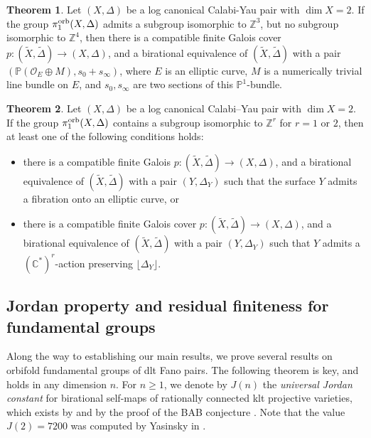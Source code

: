 \documentclass{amsart}
\newcommand{\pp}{\mathbb{P}}
\newcommand{\zz}{\mathbb{Z}}
\theoremstyle{definition}
\newtheorem{alphtheorem}{Theorem}
\theoremstyle{remark}
\numberwithin{equation}{section}
\begin{document}
\begin{alphtheorem}\label{introthm:fun-group-Z3}
Let $(X,\Delta)$ be a log canonical Calabi-Yau pair with $\dim X = 2$. If the group $\pi_1^{\rm orb}(X,\Delta)$ admits a subgroup isomorphic to $\mathbb{Z}^3$, but no subgroup isomorphic to $\mathbb{Z}^4$, then there is a compatible finite Galois cover $p:(\tilde{X},\tilde{\Delta})\to (X,\Delta)$, and a birational equivalence of $(\tilde{X},\tilde{\Delta})$ with a pair $(\mathbb{P}(\mathcal{O}_E\oplus M),s_0+s_{\infty})$, where $E$ is an elliptic curve, $M$ is a numerically trivial line bundle on $E$, and $s_0,s_{\infty}$ are two sections of this $\pp^1$-bundle.
\end{alphtheorem}

\begin{alphtheorem}\label{introthm:fun-group-inf}
Let $(X,\Delta)$ be a log canonical Calabi--Yau pair with $\dim X = 2$. 
If the group $\pi_1^{\rm orb}(X,\Delta)$ contains a subgroup isomorphic to $\zz^r$ for $r=1$ or $2$, then at least one of the following conditions holds:
\begin{itemize}
    \item[(i)] there is a compatible finite Galois $p:(\tilde{X},\tilde{\Delta})\to (X,\Delta)$, and a birational equivalence of $(\tilde{X},\tilde{\Delta})$ with a pair $(Y,\Delta_Y)$ such that the surface $Y$ admits a fibration onto an elliptic curve, or
    \item[(ii)] there is a compatible finite Galois cover $p:(\tilde{X},\tilde{\Delta})\to (X,\Delta)$, and a birational equivalence of $(\tilde{X},\tilde{\Delta})$ with a pair $(Y,\Delta_Y)$ such that $Y$ admits a $(\mathbb{C}^*)^r$-action preserving $\lfloor\Delta_Y\rfloor$.
\end{itemize}
\end{alphtheorem}


\subsection{Jordan property and residual finiteness for fundamental groups}
Along the way to establishing our main results, we prove several results on orbifold fundamental groups of dlt Fano pairs. The following theorem is key, and holds in any dimension $n$. For $n\ge 1$, we denote by $J(n)$ the {\it universal Jordan constant} for birational self-maps of rationally connected klt projective varieties, which exists by \cite[Theorem 1.8]{PS14} and by the proof of the BAB conjecture \cite[Theorem 1.1]{Bir21}. Note that the value $J(2)=7200$ was computed by Yasinsky in \cite{Yas19}.
\end{document}
